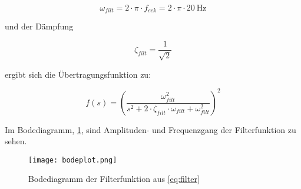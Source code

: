 \begin{equation}
	\omega_{filt} = 2 \cdot \pi \cdot f_{eck} = 2 \cdot \pi \cdot \SI{20}{\hertz}
\end{equation}


und der Dämpfung

\begin{equation}
	\zeta_{filt} = \frac{1}{\sqrt{2}}
\end{equation}

ergibt sich die Übertragungsfunktion zu:

\begin{equation} \label{eq:filter}
	f(s) = \left(\frac{\omega_{filt}^2}{s^2+2 \cdot \zeta_{filt} \cdot \omega_{filt} +\omega_{filt}^2}\right)^2
\end{equation}

Im Bodediagramm, \cref{fig:bodeplot}, sind Amplituden- und Frequenzgang der Filterfunktion zu sehen.

\begin{figure}[h!]
	\centering
	\texttt{[image: bodeplot.png]}
	\caption{Bodediagramm der Filterfunktion aus \cref{eq:filter}}
	\label{fig:bodeplot}
\end{figure}